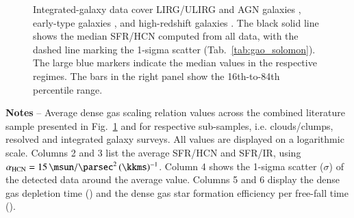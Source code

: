 \documentclass[letter, longauth]{aa} %
\begin{document}
\begin{figure}
{Integrated-galaxy data cover LIRG/ULIRG and AGN galaxies \citep{Krips2008, Gracia-Carpio2008, Juneau2009, Garcia-Burillo2012, Privon2015}, early-type galaxies \citep{Crocker2012}, and high-redshift galaxies \citep{Gao2007, Rybak2022}.
The black solid line shows the median SFR/HCN computed from all data, with the dashed line marking the 1-sigma scatter (Tab.~\ref{tab:gao_solomon}). 
The large blue markers indicate the median values in the respective regimes. 
The bars in the right panel show the 16th-to-84th percentile range.}
\label{fig:gao_solomon_relation}
\end{figure}

\begin{table}
    \begin{center}
    \caption{Gao--Solomon relation}
    \label{tab:gao_solomon}
    \end{center}
    {\bf Notes} -- Average dense gas scaling relation values across the combined literature sample presented in Fig.~\ref{fig:gao_solomon_relation} and for respective sub-samples, i.e. clouds/clumps, resolved and integrated galaxy surveys.
    All values are displayed on a logarithmic scale.
    Columns 2 and 3 list the average SFR/HCN and SFR/IR, using $\alphahcn=\SI{15}{\msun\per\square\parsec}\,(\SI{}{\kkms})^{-1}$.
    Column 4 shows the 1-sigma scatter ($\sigma$) of the detected data around the average value.
    Columns 5 and 6 display the dense gas depletion time (\taudense) and the dense gas star formation efficiency per free-fall time (\effdense).
\end{table}
\end{document}

